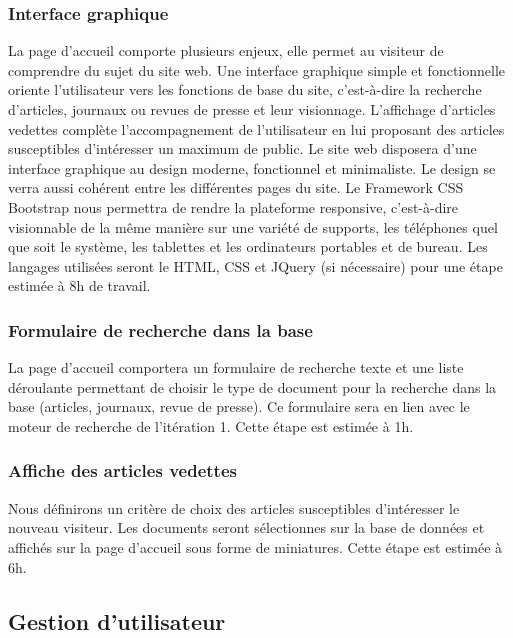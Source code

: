 		\subsubsection{Interface graphique}
			La page d'accueil comporte plusieurs enjeux, elle permet au visiteur de comprendre du sujet du site web. Une interface graphique simple et fonctionnelle oriente l'utilisateur vers les fonctions de base du site, c'est-à-dire la recherche d'articles, journaux ou revues de presse et leur visionnage. L'affichage d'articles vedettes complète l'accompagnement de l'utilisateur en lui proposant des articles susceptibles d'intéresser un maximum de public.
			Le site web disposera d'une interface graphique au design moderne, fonctionnel et minimaliste. Le design se verra aussi cohérent entre les différentes pages du site. Le Framework CSS Bootstrap nous permettra de rendre la plateforme responsive, c'est-à-dire visionnable de la même manière sur une variété de supports, les téléphones quel que soit le système, les tablettes et les ordinateurs portables et de bureau. Les langages utilisées seront le HTML, CSS et JQuery (si nécessaire) pour une étape estimée à 8h de travail.

		\subsubsection{Formulaire de recherche dans la base}
			La page d’accueil comportera un formulaire de recherche texte et une liste déroulante permettant de choisir le type de document pour la recherche dans la base (articles, journaux, revue de presse). Ce formulaire sera en lien avec le moteur de recherche de l'itération 1. Cette étape est estimée à 1h.

		\subsubsection{Affiche des articles vedettes} 
			Nous définirons un critère de choix des articles susceptibles d'intéresser le nouveau visiteur. Les documents seront sélectionnes sur la base de données et affichés sur la page d'accueil sous forme de miniatures. Cette étape est estimée à 6h.


	\subsection{Gestion d'utilisateur}
